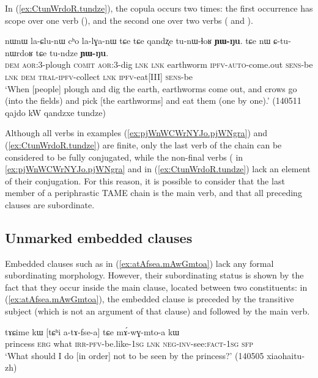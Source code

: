 In (\ref{ex:CtunWrdoR.tundze}), the copula  occurs two times: the first occurrence has scope over one verb (), and the second one over two verbs ( and ).

\begin{exe}
\ex \label{ex:CtunWrdoR.tundze}
\gll  nɯnɯ la-ɕlu-nɯ cʰo la-lɣa-nɯ tɕe tɕe qandʐe tu-nɯ-ɬoʁ \textbf{ɲɯ-ŋu}. tɕe nɯ ɕ-tu-nɯrdoʁ tɕe tu-ndze \textbf{ɲɯ-ŋu}. \\
\textsc{dem} \textsc{aor}:3\flobv{}-plough \textsc{comit}  \textsc{aor}:3\flobv{}-dig \textsc{lnk} \textsc{lnk} earthworm \textsc{ipfv}-\textsc{auto}-come.out \textsc{sens}-be \textsc{lnk} \textsc{dem} \textsc{tral}-\textsc{ipfv}-collect \textsc{lnk} \textsc{ipfv}-eat[III] \textsc{sens}-be \\
\glt `When [people] plough and dig the earth, earthworms come out, and crows go (into the fields) and pick [the earthworms] and eat them (one by one).' (140511 qajdo kW qandzxe tundze)
\end{exe}   

Although all verbs in examples (\ref{ex:pjWnWCWrNYJo.pjWNgra}) and (\ref{ex:CtunWrdoR.tundze}) are finite, only the last verb of the chain can be considered to be fully conjugated, while the non-final verbs ( in \ref{ex:pjWnWCWrNYJo.pjWNgra} and  in (\ref{ex:CtunWrdoR.tundze}) lack an element of their conjugation. For this reason, it is possible to consider that the last member of a periphrastic TAME chain is the main verb, and that all preceding clauses are subordinate.

\subsection{Unmarked embedded clauses} \label{sec:embedded.clause}
Embedded clauses such as   in  (\ref{ex:atAfsea.mAwGmtoa}) lack any formal subordinating morphology. However, their subordinating status is shown by the fact that they occur inside the main clause, located between two constituents: in (\ref{ex:atAfsea.mAwGmtoa}), the embedded clause is preceded by the transitive subject  (which is not an argument of that clause) and followed by the main verb.


\begin{exe}
\ex \label{ex:atAfsea.mAwGmtoa}
\gll tɤɕime kɯ [tɕʰi a-tɤ-fse-a] tɕe mɤ́-wɣ-mto-a kɯ \\
princess \textsc{erg} what \textsc{irr}-\textsc{pfv}-be.like-\textsc{1sg} \textsc{lnk} \textsc{neg}-\textsc{inv}-see:\textsc{fact}-\textsc{1sg} \textsc{sfp} \\
\glt `What should I do [in order] not to be seen by the princess?' (140505 xiaohaitu-zh)
\end{exe}   

